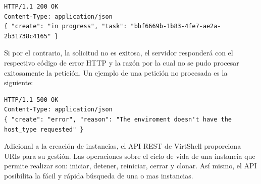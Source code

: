 \vspace{5mm}

\begin{lstlisting}[style=json, caption=Ejemplo de respuesta HTTP a la solicitud de crear una instancia]
HTTP/1.1 200 OK
Content-Type: application/json
{ "create": "in progress", "task": "bbf6669b-1b83-4fe7-ae2a-2b31738c4165" }
\end{lstlisting}

Si por el contrario, la solicitud no es exitosa, el servidor responderá con el respectivo código de error HTTP y la razón por la cual no se pudo procesar exitosamente la petición. Un ejemplo de una petición no procesada es la siguiente: 

\vspace{5mm}

\begin{lstlisting}[style=json, caption=Ejemplo de respuesta HTTP con error a la solicitud de crear una instancia]
HTTP/1.1 500 OK
Content-Type: application/json
{ "create": "error", "reason": "The enviroment doesn't have the host_type requested" }
\end{lstlisting}

\vspace{5mm}

Adicional a la creación de instancias, el API REST de VirtShell proporciona URIs para su gestión. Las operaciones sobre el ciclo de vida de una instancia que permite realizar son: iniciar, detener, reiniciar, cerrar y clonar. Así mismo, el API posibilita la fácil y rápida búsqueda de una o mas instancias.  

